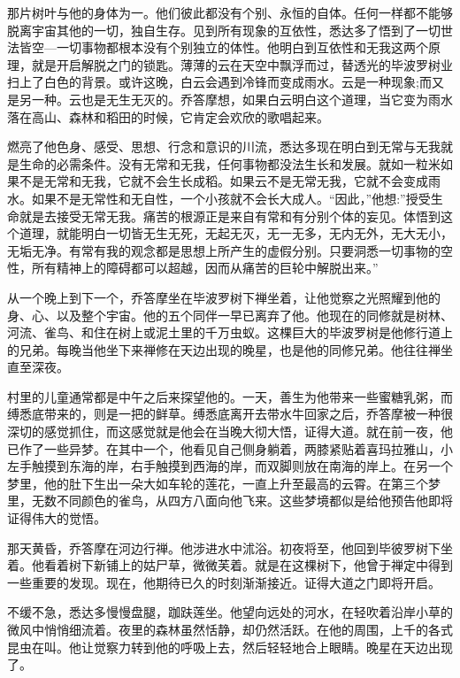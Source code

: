 \documentclass[12pt,twoside,openany]{book}
\begin{document}
那片树叶与他的身体为一。他们彼此都没有个别、永恒的自体。任何一样都不能够脱离宇宙其他的一切，独自生存。见到所有现象的互依性，悉达多了悟到了一切世法皆空—一切事物都根本没有个别独立的体性。他明白到互依性和无我这两个原理，就是开启解脱之门的锁匙。薄薄的云在天空中飘浮而过，替透光的毕波罗树业扫上了白色的背景。或许这晚，白云会遇到冷锋而变成雨水。云是一种现象;而又是另一种。云也是无生无灭的。乔答摩想，如果白云明白这个道理，当它变为雨水落在高山、森林和稻田的时候，它肯定会欢欣的歌唱起来。

燃亮了他色身、感受、思想、行念和意识的川流，悉达多现在明白到无常与无我就是生命的必需条件。没有无常和无我，任何事物都没法生长和发展。就如一粒米如果不是无常和无我，它就不会生长成稻。如果云不是无常无我，它就不会变成雨水。如果不是无常性和无自性，一个小孩就不会长大成人。“因此，”他想:”授受生命就是去接受无常无我。痛苦的根源正是来自有常和有分别个体的妄见。体悟到这个道理，就能明白一切皆无生无死，无起无灭，无一无多，无内无外，无大无小，无垢无净。有常有我的观念都是思想上所产生的虚假分别。只要洞悉一切事物的空性，所有精神上的障碍都可以超越，因而从痛苦的巨轮中解脱出来。”

从一个晚上到下一个，乔答摩坐在毕波罗树下禅坐着，让他觉察之光照耀到他的身、心、以及整个宇宙。他的五个同伴一早已离弃了他。他现在的同修就是树林、河流、雀鸟、和住在树上或泥土里的千万虫蚁。这棵巨大的毕波罗树是他修行道上的兄弟。每晚当他坐下来禅修在天边出现的晚星，也是他的同修兄弟。他往往禅坐直至深夜。

村里的儿童通常都是中午之后来探望他的。一天，善生为他带来一些蜜糖乳粥，而缚悉底带来的，则是一把的鲜草。缚悉底离开去带水牛回家之后，乔答摩被一种很深切的感觉抓住，而这感觉就是他会在当晚大彻大悟，证得大道。就在前一夜，他已作了一些异梦。在其中一个，他看见自己侧身躺着，两膝紧贴着喜玛拉雅山，小左手触摸到东海的岸，右手触摸到西海的岸，而双脚则放在南海的岸上。在另一个梦里，他的肚下生出一朵大如车轮的莲花，一直上升至最高的云霄。在第三个梦里，无数不同颜色的雀鸟，从四方八面向他飞来。这些梦境都似是给他预告他即将证得伟大的觉悟。

那天黄昏，乔答摩在河边行禅。他涉进水中沭浴。初夜将至，他回到毕彼罗树下坐着。他看着树下新铺上的姑尸草，微微芙着。就是在这棵树下，他曾于禅定中得到一些重要的发现。现在，他期待已久的时刻渐渐接近。证得大道之门即将开启。

不缓不急，悉达多慢慢盘腿，跏趺莲坐。他望向远处的河水，在轻吹着沿岸小草的微风中悄悄细流着。夜里的森林虽然恬静，却仍然活跃。在他的周围，上千的各式昆虫在叫。他让觉察力转到他的呼吸上去，然后轻轻地合上眼睛。晚星在天边出现了。

\end{document}

